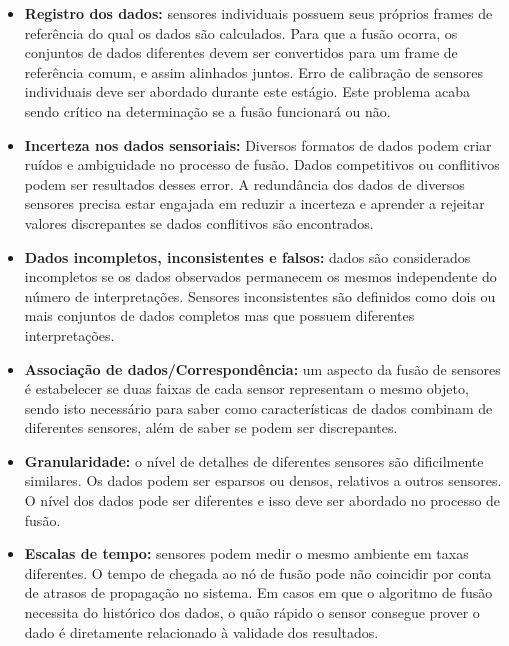 \documentclass[acronym, symbols]{fei}
\begin{document}
			\begin{itemize}
				\item \textbf{Registro dos dados:} sensores individuais possuem seus próprios frames de referência do qual os dados são calculados. Para que a fusão ocorra, os conjuntos de dados diferentes devem ser convertidos para um frame de referência comum, e assim alinhados juntos. Erro de calibração de sensores individuais deve ser abordado durante este estágio. Este problema acaba sendo crítico na determinação se a fusão funcionará ou não.
				
				\item \textbf{Incerteza nos dados sensoriais:} Diversos formatos de dados podem criar ruídos e ambiguidade no processo de fusão. Dados competitivos ou conflitivos podem ser resultados desses error. A redundância dos dados de diversos sensores precisa estar engajada em reduzir a incerteza e aprender a rejeitar valores discrepantes se dados conflitivos são encontrados.
				
				\item \textbf{Dados incompletos, inconsistentes e falsos:} dados são considerados incompletos se os dados observados permanecem os mesmos independente do número de interpretações. Sensores inconsistentes são definidos como dois ou mais conjuntos de dados completos mas que possuem diferentes interpretações.
				
				\item \textbf{Associação de dados/Correspondência:} um aspecto da fusão de sensores é estabelecer se duas faixas de cada sensor representam o mesmo objeto, sendo isto necessário para saber como características de dados combinam de diferentes sensores, além de saber se podem ser discrepantes. 
				
				\item \textbf{Granularidade:} o nível de detalhes de diferentes sensores são dificilmente similares. Os dados podem ser esparsos ou densos, relativos a outros sensores. O nível dos dados pode ser diferentes e isso deve ser abordado no processo de fusão.
				
				\item \textbf{Escalas de tempo:} sensores podem medir o mesmo ambiente em taxas diferentes. O tempo de chegada ao nó de fusão pode não coincidir por conta de atrasos de propagação no sistema. Em casos em que o algoritmo de fusão necessita do histórico dos dados, o quão rápido o sensor consegue prover o dado é diretamente relacionado à validade dos resultados.
			\end{itemize}
		
\end{document}
